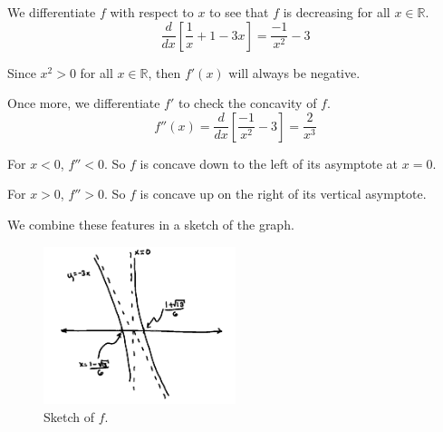 \documentclass[../hw4.tex]{subfiles}
\begin{document}
We differentiate $f$ with respect to $x$ to see that $f$ is decreasing for all $x \in \mathbb{R}$.
\[\frac{d}{dx} \left[ \frac{1}{x} + 1 - 3x \right] = \frac{-1}{x^2} - 3\]

Since $x^2>0$ for all $x\in\mathbb{R}$, then $f'(x)$ will always be negative.

Once more, we differentiate $f'$ to check the concavity of $f$.
\[f''(x) = \frac{d}{dx} \left[ \frac{-1}{x^2} - 3 \right] = \frac{2}{x^3}\]

For $x<0$, $f''<0$. So $f$ is concave down to the left of its asymptote at $x=0$.

For $x>0$, $f''>0$. So $f$ is concave up on the right of its vertical asymptote.

We combine these features in a sketch of the graph.


\begin{figure}[ht]
\centering
\includegraphics[width=0.5\textwidth]{figures/sketch.png}
\caption{Sketch of $f$.}
\end{figure}
\end{document}
